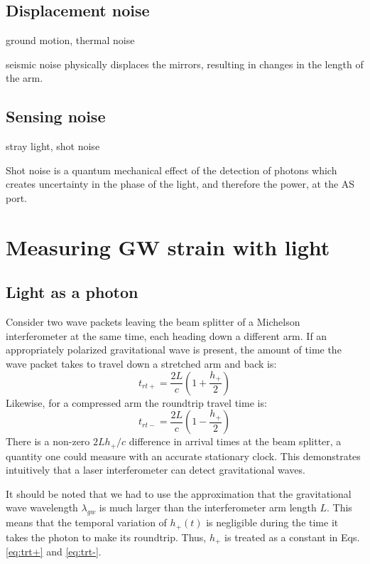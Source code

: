 \subsection{Displacement noise} 
ground motion, thermal noise

seismic noise physically displaces the mirrors, resulting in changes in the length
of the arm. 

\subsection{Sensing noise}
stray light, shot noise

Shot noise is a quantum mechanical effect of the detection
of photons which creates uncertainty in the phase of the light, and
therefore the power, at the AS port.




\section{Measuring GW strain with light}
\subsection{Light as a photon} 
Consider two wave packets leaving the beam splitter of a Michelson
interferometer at the same time, each heading down a different arm. If
an appropriately polarized gravitational wave is present, the amount
of time the wave packet takes to travel down a stretched arm and back
is:
\begin{equation}
\label{eq:trt+} 
t_{rt+} = \frac{2 L}{c} \left( 1 + \frac{h_+}{2} \right)
\end{equation}
Likewise, for a compressed arm the roundtrip travel time is:
\begin{equation}
\label{eq:trt-} 
t_{rt-} = \frac{2 L}{c} \left( 1 - \frac{h_+}{2} \right)
\end{equation}
There is a non-zero $2Lh_+/c$ difference in arrival times at the beam splitter, a quantity
one could measure with an accurate stationary clock. This demonstrates intuitively that
a laser interferometer can detect gravitational waves.

It should be noted that we had to use the approximation that the
gravitational wave wavelength $\lambda_{gw}$ is much larger than the
interferometer arm length $L$. This means that the temporal variation
of $h_+(t)$ is negligible during the time it takes the photon to make
its roundtrip. Thus, $h_+$ is treated as a constant in
Eqs. \ref{eq:trt+} and \ref{eq:trt-}.


